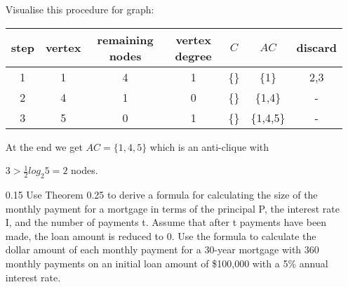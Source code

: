 \begin{enumerate}
            Visualise this procedure for graph:
            
            \begin{figure}[H]
                  \centering
            \end{figure}
            
            \begin{table}[H]
                  \centering
                  \begin{tabular}{|c|c|c|c|c|c|c|}
                        \hline
                        step & vertex & remaining nodes & vertex degree & $C$  & $AC$      & discard \\
                        \hline
                        1    & 1      & 4               & 1             & \{\} & \{1\}     & 2,3     \\
                        2    & 4      & 1               & 0             & \{\} & \{1,4\}   & -       \\
                        3    & 5      & 0               & 1             & \{\} & \{1,4,5\} & -       \\
                        \hline
                  \end{tabular}
            \end{table}
            
            At the end we get $AC = \{1,4,5\}$ which is an anti-clique with 
            
            $3 > \frac{1}{2} log_2 5 = 2$ nodes.
            
      \item[0.15]
            Use Theorem 0.25 to derive a formula for calculating the size of the monthly payment for a mortgage in terms of the principal P, the interest rate I, and the number of payments t. Assume that after t payments have been made, the loan amount is reduced to 0. Use the formula to calculate the dollar amount of each monthly payment for a 30-year mortgage with 360 monthly payments on an initial loan amount of \$100,000 with a 5\% annual interest rate.
            

\end{enumerate}
